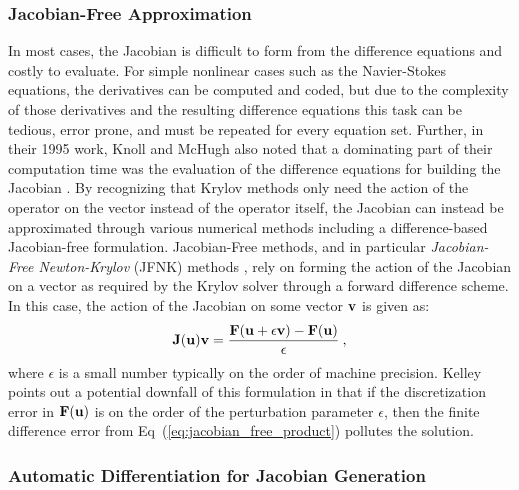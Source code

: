 \subsubsection{Jacobian-Free Approximation}
\label{subsubsec:jacobian_free_approximation}
In most cases, the Jacobian is difficult to form from the difference
equations and costly to evaluate. For simple nonlinear cases such as
the Navier-Stokes equations, the derivatives can be computed and
coded, but due to the complexity of those derivatives and the
resulting difference equations this task can be tedious, error prone,
and must be repeated for every equation set. Further, in their 1995
work, Knoll and McHugh also noted that a dominating part of their
computation time was the evaluation of the difference equations for
building the Jacobian \citep{knoll_newton-krylov_1995}. By recognizing
that Krylov methods only need the action of the operator on the vector
instead of the operator itself, the Jacobian can instead be
approximated through various numerical methods including a
difference-based Jacobian-free formulation. Jacobian-Free methods, and
in particular \textit{Jacobian-Free Newton-Krylov} (JFNK) methods
\citep{knoll_jacobian-free_2004}, rely on forming the action of the
Jacobian on a vector as required by the Krylov solver through a
forward difference scheme. In this case, the action of the Jacobian on
some vector $\mathbf{v}$ is given as:
\begin{equation}
  \mathbf{J}(\mathbf{u})\mathbf{v} = \frac{\mathbf{F}(\mathbf{u} + \epsilon \mathbf{v}) -
    \mathbf{F}(\mathbf{u})}{\epsilon}\:,
  \label{eq:jacobian_free_product}
\end{equation}
where $\epsilon$ is a small number typically on the order of machine
precision. Kelley \citep{kelley_iterative_1995} points out a potential
downfall of this formulation in that if the discretization error in
$\mathbf{F}(\mathbf{u})$ is on the order of the perturbation parameter
$\epsilon$, then the finite difference error from
Eq~(\ref{eq:jacobian_free_product}) pollutes the solution.

\subsubsection{Automatic Differentiation for Jacobian Generation}
\label{subsubsec:automatic_differentiation}

